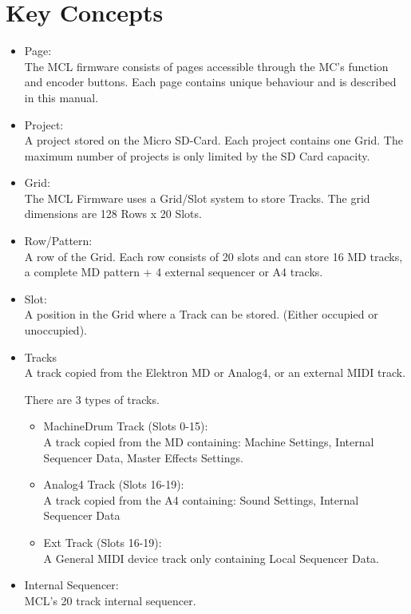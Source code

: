 \chapter{Key Concepts}

\begin{itemize}
\item Page:
\\
The MCL firmware consists of pages accessible through the MC's function and encoder buttons. Each page contains unique behaviour and is described in this manual.
\item Project:
\\
A project stored on the Micro SD-Card. Each project contains one Grid. 
The maximum number of projects is only limited by the SD Card capacity.

\item Grid:
\\
The MCL Firmware uses a Grid/Slot system to store Tracks. 
The grid dimensions are 128 Rows x 20 Slots. 

\item Row/Pattern:
\\
A row of the Grid. Each row consists of 20 slots and can store 16 MD tracks, a complete MD pattern + 4 external sequencer or A4 tracks.

\item Slot:
\\
A position in the Grid where a Track can be stored. (Either occupied or unoccupied).

\item Tracks
\\
A track copied from the Elektron MD or Analog4, or an external MIDI track.

There are 3 types of tracks.
\begin{itemize}

\item MachineDrum Track (Slots 0-15):\\
A track copied from the MD containing: Machine Settings, Internal Sequencer Data, Master Effects Settings.
\\
\item Analog4 Track (Slots 16-19):\\

A track copied from the A4 containing: Sound Settings, Internal Sequencer Data
\\
\item Ext Track (Slots 16-19):\\

A General MIDI device track only containing Local Sequencer Data.
\\
\end{itemize}

\item Internal Sequencer:\\
MCL's 20 track internal sequencer.

\end{itemize}


